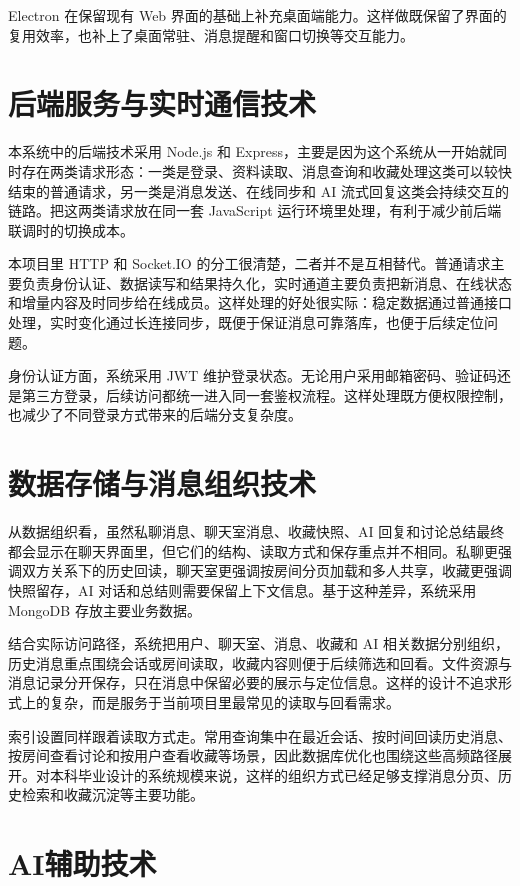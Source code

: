 Electron 在保留现有 Web 界面的基础上补充桌面端能力。这样做既保留了界面的复用效率，也补上了桌面常驻、消息提醒和窗口切换等交互能力。

\section{后端服务与实时通信技术}

本系统中的后端技术采用 Node.js 和 Express，主要是因为这个系统从一开始就同时存在两类请求形态：一类是登录、资料读取、消息查询和收藏处理这类可以较快结束的普通请求，另一类是消息发送、在线同步和 AI 流式回复这类会持续交互的链路。把这两类请求放在同一套 JavaScript 运行环境里处理，有利于减少前后端联调时的切换成本\cite{expressdocs2026}。

本项目里 HTTP 和 Socket.IO 的分工很清楚，二者并不是互相替代。普通请求主要负责身份认证、数据读写和结果持久化，实时通道主要负责把新消息、在线状态和增量内容及时同步给在线成员。这样处理的好处很实际：稳定数据通过普通接口处理，实时变化通过长连接同步，既便于保证消息可靠落库，也便于后续定位问题\cite{socketiodocs2026}。

身份认证方面，系统采用 JWT 维护登录状态。无论用户采用邮箱密码、验证码还是第三方登录，后续访问都统一进入同一套鉴权流程。这样处理既方便权限控制，也减少了不同登录方式带来的后端分支复杂度\cite{oauthbcp2025}。

\section{数据存储与消息组织技术}

从数据组织看，虽然私聊消息、聊天室消息、收藏快照、AI 回复和讨论总结最终都会显示在聊天界面里，但它们的结构、读取方式和保存重点并不相同。私聊更强调双方关系下的历史回读，聊天室更强调按房间分页加载和多人共享，收藏更强调快照留存，AI 对话和总结则需要保留上下文信息。基于这种差异，系统采用 MongoDB 存放主要业务数据\cite{mongodbdocs2026}。

结合实际访问路径，系统把用户、聊天室、消息、收藏和 AI 相关数据分别组织，历史消息重点围绕会话或房间读取，收藏内容则便于后续筛选和回看。文件资源与消息记录分开保存，只在消息中保留必要的展示与定位信息。这样的设计不追求形式上的复杂，而是服务于当前项目里最常见的读取与回看需求。

索引设置同样跟着读取方式走。常用查询集中在最近会话、按时间回读历史消息、按房间查看讨论和按用户查看收藏等场景，因此数据库优化也围绕这些高频路径展开。对本科毕业设计的系统规模来说，这样的组织方式已经足够支撑消息分页、历史检索和收藏沉淀等主要功能。

\section{AI辅助技术}


